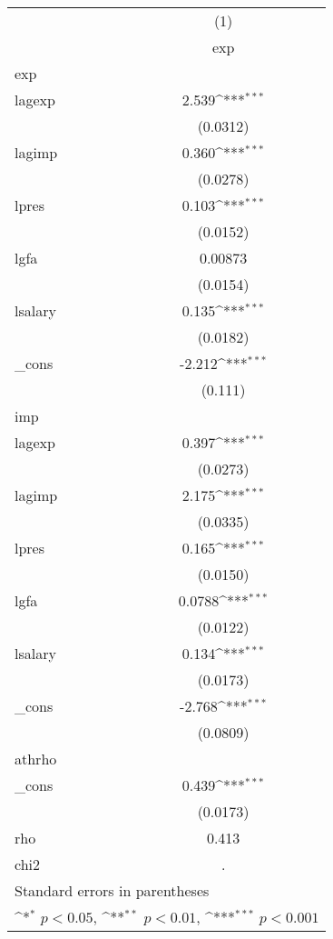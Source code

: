 {
\def\sym#1{\ifmmode^{#1}\else\(^{#1}\)\fi}
\begin{tabular}{l*{1}{c}}
\hline\hline
            &\multicolumn{1}{c}{(1)}\\
            &\multicolumn{1}{c}{exp}\\
\hline
exp         &                     \\
lagexp      &       2.539\sym{***}\\
            &    (0.0312)         \\
[1em]
lagimp      &       0.360\sym{***}\\
            &    (0.0278)         \\
[1em]
lpres       &       0.103\sym{***}\\
            &    (0.0152)         \\
[1em]
lgfa        &     0.00873         \\
            &    (0.0154)         \\
[1em]
lsalary     &       0.135\sym{***}\\
            &    (0.0182)         \\
[1em]
\_cons      &      -2.212\sym{***}\\
            &     (0.111)         \\
\hline
imp         &                     \\
lagexp      &       0.397\sym{***}\\
            &    (0.0273)         \\
[1em]
lagimp      &       2.175\sym{***}\\
            &    (0.0335)         \\
[1em]
lpres       &       0.165\sym{***}\\
            &    (0.0150)         \\
[1em]
lgfa        &      0.0788\sym{***}\\
            &    (0.0122)         \\
[1em]
lsalary     &       0.134\sym{***}\\
            &    (0.0173)         \\
[1em]
\_cons      &      -2.768\sym{***}\\
            &    (0.0809)         \\
\hline
athrho      &                     \\
\_cons      &       0.439\sym{***}\\
            &    (0.0173)         \\
\hline
rho         &       0.413         \\
chi2        &           .         \\
\hline\hline
\multicolumn{2}{l}{\footnotesize Standard errors in parentheses}\\
\multicolumn{2}{l}{\footnotesize \sym{*} \(p<0.05\), \sym{**} \(p<0.01\), \sym{***} \(p<0.001\)}\\
\end{tabular}
}
